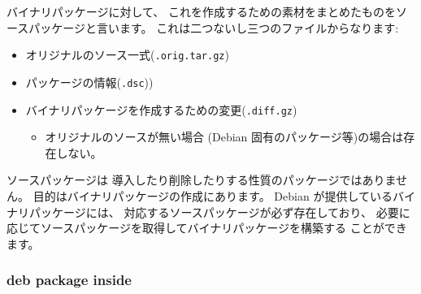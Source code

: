 \documentclass[mingoth,a4paper]{jsarticle}
\begin{document}
バイナリパッケージに対して、 
これを作成するための素材をまとめたものをソースパッケージと言います。 
%
これは二つないし三つのファイルからなります:
\begin{itemize}
      \item オリジナルのソース一式({\tt .orig.tar.gz})
      \item パッケージの情報({\tt .dsc}))
      \item バイナリパッケージを作成するための変更({\tt .diff.gz})
    \begin{itemize}
          \item オリジナルのソースが無い場合
        (Debian 固有のパッケージ等)の場合は存在しない。
    \end{itemize}
\end{itemize}
ソースパッケージは
導入したり削除したりする性質のパッケージではありません。  
%
目的はバイナリパッケージの作成にあります。 
%
Debian が提供しているバイナリパッケージには、 
対応するソースパッケージが必ず存在しており、 
必要に応じてソースパッケージを取得してバイナリパッケージを構築する
ことができます。

\subsubsection{deb package inside}
\end{document}

